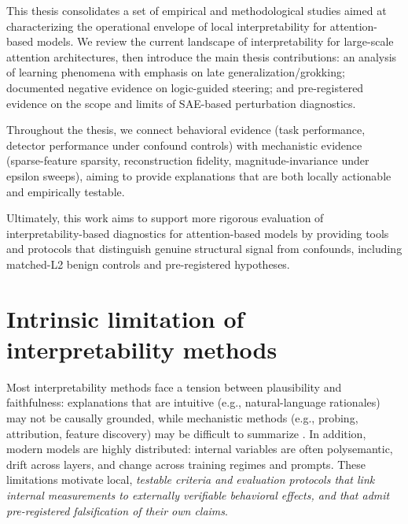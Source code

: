 ﻿\documentclass[../ppgc-tese.tex]{subfiles}
\begin{document}

This thesis consolidates a set of empirical and methodological studies aimed at characterizing the operational envelope of local interpretability for attention-based models. We review the current landscape of interpretability for large-scale attention architectures, then introduce the main thesis contributions: an analysis of learning phenomena with emphasis on late generalization/grokking; documented negative evidence on logic-guided steering; and pre-registered evidence on the scope and limits of SAE-based perturbation diagnostics.

Throughout the thesis, we connect behavioral evidence (task performance, detector performance under confound controls) with mechanistic evidence (sparse-feature sparsity, reconstruction fidelity, magnitude-invariance under epsilon sweeps), aiming to provide explanations that are both locally actionable and empirically testable.

Ultimately, this work aims to support more rigorous evaluation of interpretability-based diagnostics for attention-based models by providing tools and protocols that distinguish genuine structural signal from confounds, including matched-L2 benign controls and pre-registered hypotheses.



\section{Intrinsic limitation of interpretability methods}
Most interpretability methods face a tension between plausibility and faithfulness: explanations that are intuitive (e.g., natural-language rationales) may not be causally grounded, while mechanistic methods (e.g., probing, attribution, feature discovery) may be difficult to summarize \cite{jacovi2020faithfulness}.
In addition, modern models are highly distributed: internal variables are often polysemantic, drift across layers, and change across training regimes and prompts.
These limitations motivate local, \emph{testable criteria and evaluation protocols that link internal measurements to externally verifiable behavioral effects, and that admit pre-registered falsification of their own claims}.
\end{document}
